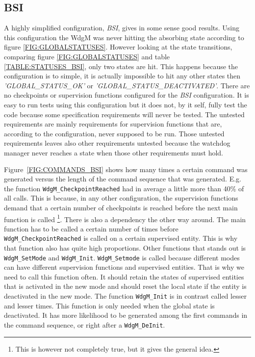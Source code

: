 \subsection{BSI}
A highly simplified configuration, \emph{BSI}, gives in some sense good results.
Using this configuration the WdgM was never hitting the absorbing state
according to figure \ref{FIG:GLOBALSTATUSES}.  However looking at the state
transitions, comparing figure \ref{FIG:GLOBALSTATUSES} and table
\ref{TABLE:STATUSES_BSI}, only two states are hit. This happens
because the configuration is to simple, it is actually impossible to hit
any other states then \emph{'GLOBAL\_STATUS\_OK'} or
\emph{'GLOBAL\_STATUS\_DEACTIVATED'}. There are no checkpoints or supervision
functions configured for the \emph{BSI} configuration.
It is easy to run tests using this configuration but it does not, by it self,
fully test the code because some specification requirements will never be
tested. The untested requirements are mainly requirements for supervision
functions that are, according to the configuration, never supposed to be
run. Those untested requirements leaves also other requirements untested because
the watchdog manager never reaches a state when those other requirements must
hold.

Figure~\ref{FIG:COMMANDS_BSI} shows how many times a certain command was
generated versus the length of the command sequence that was generated. E.g. the
function \lstinline!WdgM_CheckpointReached! had in average a little more than
40\% of all calls. This is because, in any other configuration, the supervision
functions demand that a certain number of checkpoints is reached before the next
main function is called \footnote{This is however not completely true, but it
  gives the general idea.}. There is also a dependency the other way around. The
main function has to be called a certain number of times before
\lstinline!WdgM_CheckpointReached! is called on a certain supervised
entity. This is why that function also has quite high proportions. Other
functions that stands out is \lstinline!WdgM_SetMode! and \lstinline!WdgM_Init!.
\lstinline!WdgM_Setmode! is called because different modes can have different
supervision functions and supervised entities. That is why we need to call this
function often. It should retain the states of supervised entities that is
activated in the new mode and should reset the local state if the entity is
deactivated in the new mode. The function \lstinline!WdgM_Init! is in contrast
called lesser and lesser times. This function is only needed when the global
state is deactivated. It has more likelihood to be generated among the first
commands in the command sequence, or right after a \lstinline!WdgM_DeInit!.

